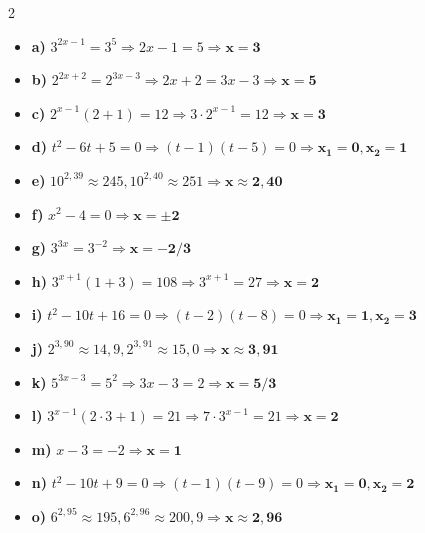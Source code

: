 \documentclass[12pt,a4paper]{article}
\begin{document}
\begin{multicols}{2}
\begin{itemize}[]
    \item \textbf{a)} $3^{2x-1} = 3^5 \Rightarrow 2x-1=5 \Rightarrow \boldsymbol{x=3}$
    \item \textbf{b)} $2^{2x+2} = 2^{3x-3} \Rightarrow 2x+2=3x-3 \Rightarrow \boldsymbol{x=5}$
    \item \textbf{c)} $2^{x-1}(2+1)=12 \Rightarrow 3 \cdot 2^{x-1}=12 \Rightarrow \boldsymbol{x=3}$
    \item \textbf{d)} $t^2-6t+5=0 \Rightarrow (t-1)(t-5)=0 \Rightarrow \boldsymbol{x_1=0, x_2=1}$
    \item \textbf{e)} $10^{2,39} \approx 245, 10^{2,40} \approx 251 \Rightarrow \boldsymbol{x \approx 2,40}$
    \item \textbf{f)} $x^2-4=0 \Rightarrow \boldsymbol{x = \pm 2}$
    \item \textbf{g)} $3^{3x} = 3^{-2} \Rightarrow \boldsymbol{x = -2/3}$
    \item \textbf{h)} $3^{x+1}(1+3)=108 \Rightarrow 3^{x+1}=27 \Rightarrow \boldsymbol{x=2}$
    \item \textbf{i)} $t^2-10t+16=0 \Rightarrow (t-2)(t-8)=0 \Rightarrow \boldsymbol{x_1=1, x_2=3}$
    \item \textbf{j)} $2^{3,90} \approx 14,9, 2^{3,91} \approx 15,0 \Rightarrow \boldsymbol{x \approx 3,91}$
    \item \textbf{k)} $5^{3x-3} = 5^2 \Rightarrow 3x-3=2 \Rightarrow \boldsymbol{x=5/3}$
    \item \textbf{l)} $3^{x-1}(2 \cdot 3 + 1) = 21 \Rightarrow 7 \cdot 3^{x-1}=21 \Rightarrow \boldsymbol{x=2}$
    \item \textbf{m)} $x-3=-2 \Rightarrow \boldsymbol{x=1}$
    \item \textbf{n)} $t^2-10t+9=0 \Rightarrow (t-1)(t-9)=0 \Rightarrow \boldsymbol{x_1=0, x_2=2}$
    \item \textbf{o)} $6^{2,95} \approx 195, 6^{2,96} \approx 200,9 \Rightarrow \boldsymbol{x \approx 2,96}$
\end{itemize}
\end{multicols}
\end{document}
